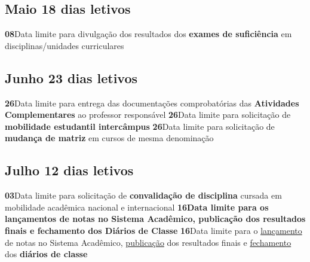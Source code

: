 \documentclass[thesis]{hmcposter}
\begin{document}
\begin{poster}
\subsection{Maio \hfill 18 dias letivos}\textbf{08}\qquad Data limite para divulgação dos resultados dos \textbf{exames de suficiência} em disciplinas/unidades curriculares \newline \null\subsection{Junho \hfill 23 dias letivos}\textbf{26}\qquad Data limite para entrega das documentações comprobatórias das \textbf{Atividades Complementares} ao professor responsável \newline \null\textbf{26}\qquad Data limite para solicitação de \textbf{mobilidade estudantil intercâmpus} \newline \null\textbf{26}\qquad Data limite para solicitação de \textbf{mudança de matriz} em cursos de mesma denominação \newline \null\subsection{Julho \hfill 12 dias letivos}\textbf{03}\qquad Data limite para solicitação de \textbf{convalidação de disciplina} cursada em mobilidade acadêmica nacional e internacional \newline \null\textbf{16}\qquad \textbf{Data limite para os lançamentos de notas no Sistema Acadêmico, publicação dos resultados finais e fechamento dos Diários de Classe} \newline \null\textbf{16}\qquad Data limite para o \underline{lançamento} de notas no Sistema Acadêmico, \underline{publicação} dos resultados finais e \underline{fechamento} dos \textbf{diários de classe} \newline \null\newpage

\end{poster}
\end{document}
